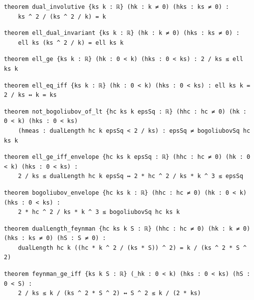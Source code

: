 \begin{lstlisting}[style=leancat]
theorem dual_involutive {ks k : ℝ} (hk : k ≠ 0) (hks : ks ≠ 0) :
    ks ^ 2 / (ks ^ 2 / k) = k
\end{lstlisting}

\begin{lstlisting}[style=leancat]
theorem ell_dual_invariant {ks k : ℝ} (hk : k ≠ 0) (hks : ks ≠ 0) :
    ell ks (ks ^ 2 / k) = ell ks k
\end{lstlisting}

\begin{lstlisting}[style=leancat]
theorem ell_ge {ks k : ℝ} (hk : 0 < k) (hks : 0 < ks) : 2 / ks ≤ ell ks k
\end{lstlisting}

\begin{lstlisting}[style=leancat]
theorem ell_eq_iff {ks k : ℝ} (hk : 0 < k) (hks : 0 < ks) : ell ks k = 2 / ks ↔ k = ks
\end{lstlisting}

\begin{lstlisting}[style=leancat]
theorem not_bogoliubov_of_lt {hc ks k epsSq : ℝ} (hhc : hc ≠ 0) (hk : 0 < k) (hks : 0 < ks)
    (hmeas : dualLength hc k epsSq < 2 / ks) : epsSq ≠ bogoliubovSq hc ks k
\end{lstlisting}

\begin{lstlisting}[style=leancat]
theorem ell_ge_iff_envelope {hc ks k epsSq : ℝ} (hhc : hc ≠ 0) (hk : 0 < k) (hks : 0 < ks) :
    2 / ks ≤ dualLength hc k epsSq ↔ 2 * hc ^ 2 / ks * k ^ 3 ≤ epsSq
\end{lstlisting}

\begin{lstlisting}[style=leancat]
theorem bogoliubov_envelope {hc ks k : ℝ} (hhc : hc ≠ 0) (hk : 0 < k) (hks : 0 < ks) :
    2 * hc ^ 2 / ks * k ^ 3 ≤ bogoliubovSq hc ks k
\end{lstlisting}

\begin{lstlisting}[style=leancat]
theorem dualLength_feynman {hc ks k S : ℝ} (hhc : hc ≠ 0) (hk : k ≠ 0) (hks : ks ≠ 0) (hS : S ≠ 0) :
    dualLength hc k ((hc * k ^ 2 / (ks * S)) ^ 2) = k / (ks ^ 2 * S ^ 2)
\end{lstlisting}

\begin{lstlisting}[style=leancat]
theorem feynman_ge_iff {ks k S : ℝ} (_hk : 0 < k) (hks : 0 < ks) (hS : 0 < S) :
    2 / ks ≤ k / (ks ^ 2 * S ^ 2) ↔ S ^ 2 ≤ k / (2 * ks)
\end{lstlisting}

